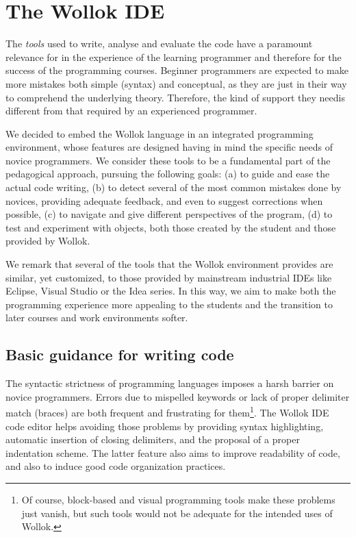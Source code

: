 \section{The Wollok IDE}
\label{sec:environment}

The \emph{tools} used to write, analyse and evaluate the code have a paramount relevance 
for in the experience of the learning programmer
and therefore for the success of the programming courses.
Beginner programmers are expected to make more mistakes both simple (\eg syntax) and conceptual, 
as they are just in their way to comprehend the underlying theory.
Therefore, the kind of support they needis different 
from that required by an experienced programmer.

We decided to embed the Wollok language in an integrated programming environment, 
whose features are designed having in mind the specific needs of novice programmers.
We consider these tools to be a fundamental part of the pedagogical approach, pursuing the following goals:
(a) to guide and ease the actual code writing,
(b) to detect several of the most common mistakes done by novices, 
providing adequate feedback, and even to suggest corrections when possible,
(c) to navigate and give different perspectives of the program,
(d) to test and experiment with objects, both those created by the student and those provided by Wollok.

We remark that several of the tools that the Wollok environment provides are similar, yet customized, 
to those provided by mainstream industrial IDEs like Eclipse, Visual Studio or the Idea series. 
In this way, we aim to make both the programming experience more appealing to the students
and the transition to later courses and work environments softer.

\subsection{Basic guidance for writing code}
The syntactic strictness of programming languages imposes a harsh barrier on novice programmers. 
Errors due to mispelled keywords or lack of proper delimiter match (\eg braces) are both frequent and frustrating for them\footnote{Of course, block-based and visual programming tools make these problems just vanish,
but such tools would not be adequate for the intended uses of Wollok.}.
The Wollok IDE code editor helps avoiding those problems by providing
syntax highlighting, 
automatic insertion of closing delimiters, 
and the proposal of a proper indentation scheme. 
The latter feature also aims to improve readability of code, 
and also to induce good code organization practices.

